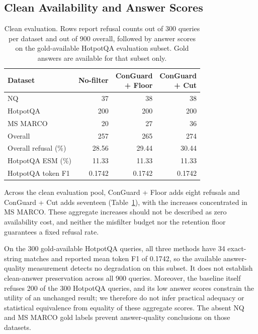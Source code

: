 \documentclass[sigconf]{aamas}
\begin{document}
\subsection{Clean Availability and Answer Scores}
\begin{table}[t]
\caption{Clean evaluation. Rows report refusal counts out of 300 queries per dataset and out of 900 overall, followed by answer scores on the gold-available HotpotQA evaluation subset. Gold answers are available for that subset only.}
\label{tab:clean}
\centering
\begin{tabular}{lrrr}
\toprule
Dataset & No-filter & \shortstack{ConGuard\\+ Floor} & \shortstack{ConGuard\\+ Cut}\\
\midrule
NQ & 37 & 38 & 38\\
HotpotQA & 200 & 200 & 200\\
MS MARCO & 20 & 27 & 36\\
Overall & 257 & 265 & 274\\
Overall refusal (\%) & 28.56 & 29.44 & 30.44\\
HotpotQA ESM (\%) & 11.33 & 11.33 & 11.33\\
HotpotQA token F1 & 0.1742 & 0.1742 & 0.1742\\
\bottomrule
\end{tabular}
\end{table}
Across the clean evaluation pool, ConGuard + Floor adds eight refusals and ConGuard + Cut adds seventeen (Table~\ref{tab:clean}), with the increases concentrated in MS MARCO. These aggregate increases should not be described as zero availability cost, and neither the misfilter budget nor the retention floor guarantees a fixed refusal rate.

On the 300 gold-available HotpotQA queries, all three methods have 34 exact-string matches and reported mean token F1 of 0.1742, so the available answer-quality measurement detects no degradation on this subset. It does not establish clean-answer preservation across all 900 queries. Moreover, the baseline itself refuses 200 of the 300 HotpotQA queries, and its low answer scores constrain the utility of an unchanged result; we therefore do not infer practical adequacy or statistical equivalence from equality of these aggregate scores. The absent NQ and MS MARCO gold labels prevent answer-quality conclusions on those datasets.
\end{document}
